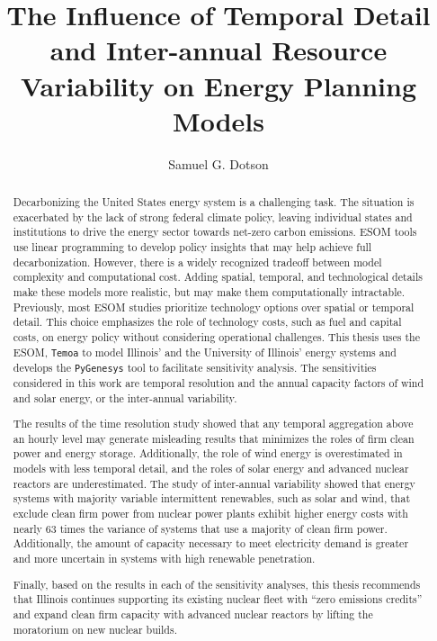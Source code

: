 \documentclass[edeposit,fullpage,11pt]{uiucthesis2018}
\title{The Influence of Temporal Detail and Inter-annual Resource Variability on
Energy Planning Models}
\author{Samuel G. Dotson}
\begin{document}
% 

\maketitle
%
\frontmatter
\begin{abstract}

Decarbonizing the United States energy system is a challenging task. The situation
is exacerbated by the lack of strong federal climate policy, leaving individual
states and institutions to drive the energy sector towards net-zero carbon emissions.
ESOM tools use linear programming to develop policy insights that may help achieve
full decarbonization. However, there is a widely recognized tradeoff between model
complexity and computational cost. Adding spatial, temporal, and technological
details make these models more realistic, but may make them computationally
intractable. Previously, most ESOM studies prioritize technology options over
spatial or temporal detail. This choice emphasizes the role of technology costs,
such as fuel and capital costs, on energy policy without considering operational
challenges. This thesis uses the ESOM, \texttt{Temoa} to model Illinois' and
the University of Illinois' energy systems and develops the \texttt{PyGenesys}
tool to facilitate sensitivity analysis. The sensitivities considered in this work
are temporal resolution and the annual capacity factors of wind and solar energy,
or the inter-annual variability.

The results of the time resolution study showed that any temporal aggregation
above an hourly level may generate misleading results that minimizes the roles
of firm clean power and energy storage. Additionally, the role of wind energy is
overestimated in models with less temporal detail, and the roles of solar energy
and advanced nuclear reactors are underestimated. The study of inter-annual variability
showed that energy systems with majority variable intermittent renewables, such
as solar and wind, that exclude clean firm power from nuclear power plants exhibit
higher energy costs with nearly 63 times the variance of systems that use a
majority of clean firm power. Additionally, the amount of capacity necessary to meet
electricity demand is greater and more uncertain in systems with high renewable
penetration.

Finally, based on the results in each of the sensitivity analyses, this thesis
recommends that Illinois continues supporting its existing nuclear fleet with
``zero emissions credits'' and expand clean firm capacity with advanced nuclear
reactors by lifting the moratorium on new nuclear builds.


\end{abstract}
\end{document}
